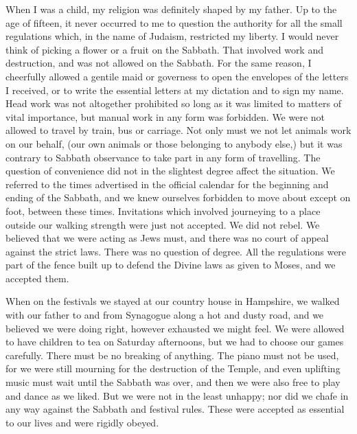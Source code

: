 When I was a child, my religion was definitely
shaped by my father. Up to the age of fifteen, it
never occurred to me to question the authority
for all the small regulations which, in the name
of Judaism, restricted my liberty. I would never
think of picking a flower or a fruit on the
Sabbath. That involved work and destruction, and was
not allowed on the Sabbath. For the same reason, I
cheerfully allowed a gentile maid or governess to open
the envelopes of the letters I received, or to write the
essential letters at my dictation and to sign my name.
Head work was not altogether prohibited so long as it
was limited to matters of vital importance, but manual
work in any form was forbidden. We were not allowed
to travel by train, bus or carriage. Not only must we
not let animals work on our behalf, (our own animals or
those belonging to anybody else,) but it was contrary to
Sabbath observance to take part in any form of travelling.
The question of convenience did not in the slightest
degree affect the situation. We referred to the times
advertised in the official calendar for the beginning and
ending of the Sabbath, and we knew ourselves forbidden
to move about except on foot, between these times.
Invitations which involved journeying to a place outside
our walking strength were just not accepted. We did
not rebel. We believed that we were acting as Jews
must, and there was no court of appeal against the strict
laws. There was no question of degree. All the regulations
were part of the fence built up to defend the
Divine laws as given to Moses, and we accepted them.

When on the festivals we stayed at our country
house in Hampshire, we walked with our father to and
from Synagogue along a hot and dusty road, and we
believed we were doing right, however exhausted we
might feel. We were allowed to have children to tea
on Saturday afternoons, but we had to choose our games
carefully. There must be no breaking of anything. The
piano must not be used, for we were still mourning for
the destruction of the Temple, and even uplifting music
must wait until the Sabbath was over, and then we were
also free to play and dance as we liked. But we were not
in the least unhappy; nor did we chafe in any way against
the Sabbath and festival rules. These were accepted as
essential to our lives and were rigidly obeyed.


